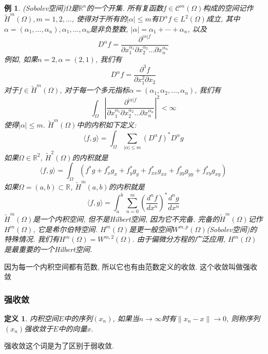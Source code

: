 \documentclass[a4paper,11pt]{book}
\newtheorem{definition}{\hspace{2em}定义}[section]
\newtheorem{example}{例}[section]
\begin{document}
\begin{example}
  (Sobolev空间)$\Omega$是$\mathbb{R}^n$的一个开集. 所有复函数$f\in\mathcal{C}^m(\Omega)$构成的空间记作$\tilde{H}^m(\Omega),m=1,2,\dots$, 使得对于所有的$|\alpha|\leq m$有$D^\alpha f\in L^2(\Omega)$成立, 其中$\alpha=(\alpha_1,\dots,\alpha_n), \alpha_1,\dots,\alpha_n$是非负整数, $|\alpha|=\alpha_1+\cdots+\alpha_n$, 以及
  \begin{equation*}
    D^\alpha f=\frac{\partial^{|\alpha|f}}{\partial x_1^{\alpha_1}\partial x_2^{\alpha_2}\dots\partial x_n^{\alpha_n}}
  \end{equation*}
  例如, 如果$n=2,\alpha=(2,1)$, 我们有
  \begin{equation*}
    D^\alpha f=\frac{\partial^3 f}{\partial x_1^2\partial x_2}
  \end{equation*}
  对于$f\in\tilde{H}^m(\Omega)$, 对于每一个多元指标$\alpha=(\alpha_1,\alpha_2,\dots,\alpha_n)$, 我们有
  \begin{equation*}
    \int_{\Omega}|\frac{\partial^{|\alpha| f}}{\partial x_1^{\alpha_1}\partial x_2^{\alpha_2}\dots\partial x_n^{\alpha_n}}|^2<\infty
  \end{equation*}
  使得$|\alpha|\leq m$. $\tilde{H}^m(\Omega)$中的内积如下定义:
  \begin{equation*}
    \langle f,g\rangle=\int_{\Omega}\sum_{|\alpha|\leq m}(D^\alpha f)^*D^\alpha g
  \end{equation*}
  如果$\Omega\in \mathbb{R}^2$, $\tilde{H}^2(\Omega)$的内积就是
  \begin{equation*}
    \langle f,g\rangle=\int_{\Omega}(f^*g+f_x^*g_x+f_y^*g_y+f_{xx}^*g_{xx}+f_{yy}^*g_{yy}+f_{xy}^*g_{xy})
  \end{equation*}
  如果$\Omega=(a,b)\subset \mathbb{R}$, $\tilde{H}^m(a,b)$的内积就是
  \begin{equation*}
    \langle f,g\rangle=\int_{a}^{b}\sum_{n=0}^{m}(\frac{d^n f}{dx^n})^* \frac{d^n g}{dx^n}
  \end{equation*}
  $\tilde{H}^m(\Omega)$是一个内积空间, 但不是Hilbert空间, 因为它不完备. 完备的$\tilde{H}^m(\Omega)$记作$H^m(\Omega)$, 它是希尔伯特空间. $H^m(\Omega)$是更一般空间$W^{m,p}(\Omega)$(Sobolev空间)的特殊情况. 我们有$H^m(\Omega)=W^{m,2}(\Omega)$. 由于偏微分方程的广泛应用, $H^m(\Omega)$是最重要的一个Hilbert空间.
\end{example}
因为每一个内积空间都有范数, 所以它也有由范数定义的收敛. 这个收敛叫做强收敛
\subsubsection*{强收敛}
\begin{definition}
  内积空间$E$中的序列$(x_n)$, 如果当$n\to\infty$时有$\|x_n-x\|\to 0$, 则称序列$(x_n)$强收敛于$E$中的向量$x$.
\end{definition}
强收敛这个词是为了区别于弱收敛.
\end{document}
